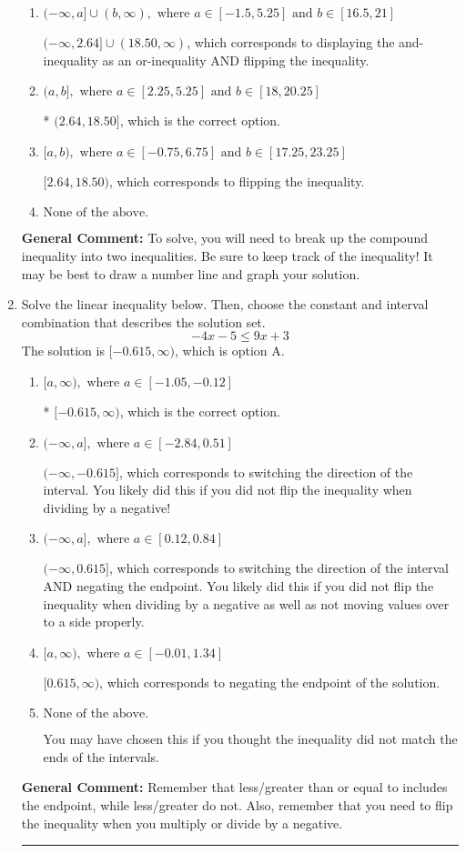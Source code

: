 \documentclass{extbook}[14pt]
\newcommand{\litem}[1]{\item #1

\rule{\textwidth}{0.4pt}}
\begin{document}
\begin{enumerate}
{\begin{enumerate}[label=\Alph*.]
$(-\infty, 2.64) \cup [18.50, \infty)$, which corresponds to displaying the and-inequality as an or-inequality.
\item \( (-\infty, a] \cup (b, \infty), \text{ where } a \in [-1.5, 5.25] \text{ and } b \in [16.5, 21] \)

$(-\infty, 2.64] \cup (18.50, \infty)$, which corresponds to displaying the and-inequality as an or-inequality AND flipping the inequality.
\item \( (a, b], \text{ where } a \in [2.25, 5.25] \text{ and } b \in [18, 20.25] \)

* $(2.64, 18.50]$, which is the correct option.
\item \( [a, b), \text{ where } a \in [-0.75, 6.75] \text{ and } b \in [17.25, 23.25] \)

$[2.64, 18.50)$, which corresponds to flipping the inequality.
\item \( \text{None of the above.} \)


\end{enumerate}

\textbf{General Comment:} To solve, you will need to break up the compound inequality into two inequalities. Be sure to keep track of the inequality! It may be best to draw a number line and graph your solution.
}
\litem{
Solve the linear inequality below. Then, choose the constant and interval combination that describes the solution set.
\[ -4x -5 \leq 9x + 3 \]The solution is \( [-0.615, \infty) \), which is option A.\begin{enumerate}[label=\Alph*.]
\item \( [a, \infty), \text{ where } a \in [-1.05, -0.12] \)

* $[-0.615, \infty)$, which is the correct option.
\item \( (-\infty, a], \text{ where } a \in [-2.84, 0.51] \)

 $(-\infty, -0.615]$, which corresponds to switching the direction of the interval. You likely did this if you did not flip the inequality when dividing by a negative!
\item \( (-\infty, a], \text{ where } a \in [0.12, 0.84] \)

 $(-\infty, 0.615]$, which corresponds to switching the direction of the interval AND negating the endpoint. You likely did this if you did not flip the inequality when dividing by a negative as well as not moving values over to a side properly.
\item \( [a, \infty), \text{ where } a \in [-0.01, 1.34] \)

 $[0.615, \infty)$, which corresponds to negating the endpoint of the solution.
\item \( \text{None of the above}. \)

You may have chosen this if you thought the inequality did not match the ends of the intervals.
\end{enumerate}

\textbf{General Comment:} Remember that less/greater than or equal to includes the endpoint, while less/greater do not. Also, remember that you need to flip the inequality when you multiply or divide by a negative.
}
\end{enumerate}
\end{document}
